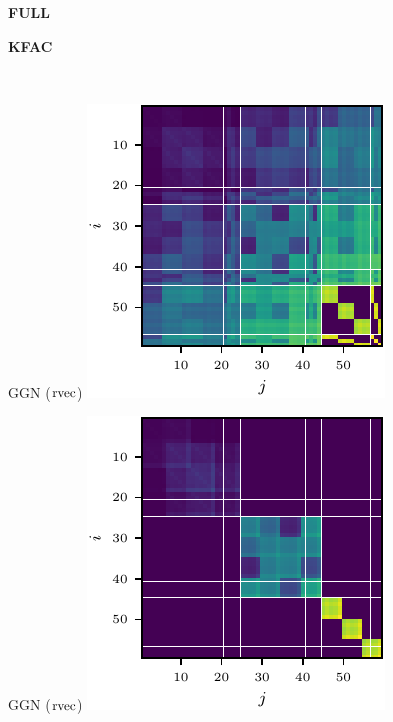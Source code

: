 \begin{figure}[t!]
  \centering
  \begin{minipage}[t]{0.485\linewidth}
    \centering
    \textbf{FULL}
  \end{minipage}
  \hfill
  \begin{minipage}[t]{0.485\linewidth}
    \centering
    \textbf{KFAC}
  \end{minipage}
  \\
  \begin{minipage}[t]{0.485\linewidth}
    \centering
     GGN ($\operatorname{rvec}$)\vspace{1ex}
    \includegraphics[width=0.8\linewidth]{../kfs/plots/synthetic_rvec_ggn_full.pdf}
  \end{minipage}
  \hfill
  \begin{minipage}[t]{0.485\linewidth}
    \centering
    GGN ($\operatorname{rvec}$)\vspace{1ex}
    \includegraphics[width=0.8\linewidth]{../kfs/plots/synthetic_rvec_ggn_kfac.pdf}

\end{minipage}
\end{figure}
